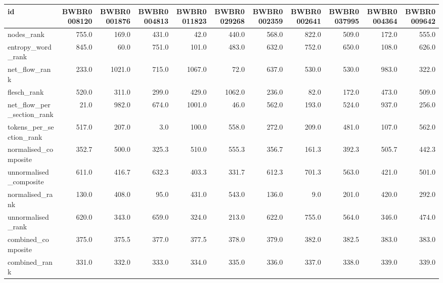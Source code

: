 \begin{tabular}{lrrrrrrrrrr}
\toprule
id & BWBR0008120 & BWBR0001876 & BWBR0004813 & BWBR0011823 & BWBR0029268 & BWBR0002359 & BWBR0002641 & BWBR0037995 & BWBR0004364 & BWBR0009642 \\
\midrule
nodes\_rank & 755.0 & 169.0 & 431.0 & 42.0 & 440.0 & 568.0 & 822.0 & 509.0 & 172.0 & 555.0 \\
\cline{1-11}
entropy\_word\_rank & 845.0 & 60.0 & 751.0 & 101.0 & 483.0 & 632.0 & 752.0 & 650.0 & 108.0 & 626.0 \\
\cline{1-11}
net\_flow\_rank & 233.0 & 1021.0 & 715.0 & 1067.0 & 72.0 & 637.0 & 530.0 & 530.0 & 983.0 & 322.0 \\
\cline{1-11}
flesch\_rank & 520.0 & 311.0 & 299.0 & 429.0 & 1062.0 & 236.0 & 82.0 & 172.0 & 473.0 & 509.0 \\
\cline{1-11}
net\_flow\_per\_section\_rank & 21.0 & 982.0 & 674.0 & 1001.0 & 46.0 & 562.0 & 193.0 & 524.0 & 937.0 & 256.0 \\
\cline{1-11}
tokens\_per\_section\_rank & 517.0 & 207.0 & 3.0 & 100.0 & 558.0 & 272.0 & 209.0 & 481.0 & 107.0 & 562.0 \\
\cline{1-11}
normalised\_composite & 352.7 & 500.0 & 325.3 & 510.0 & 555.3 & 356.7 & 161.3 & 392.3 & 505.7 & 442.3 \\
\cline{1-11}
unnormalised\_composite & 611.0 & 416.7 & 632.3 & 403.3 & 331.7 & 612.3 & 701.3 & 563.0 & 421.0 & 501.0 \\
\cline{1-11}
normalised\_rank & 130.0 & 408.0 & 95.0 & 431.0 & 543.0 & 136.0 & 9.0 & 201.0 & 420.0 & 292.0 \\
\cline{1-11}
unnormalised\_rank & 620.0 & 343.0 & 659.0 & 324.0 & 213.0 & 622.0 & 755.0 & 564.0 & 346.0 & 474.0 \\
\cline{1-11}
combined\_composite & 375.0 & 375.5 & 377.0 & 377.5 & 378.0 & 379.0 & 382.0 & 382.5 & 383.0 & 383.0 \\
\cline{1-11}
combined\_rank & 331.0 & 332.0 & 333.0 & 334.0 & 335.0 & 336.0 & 337.0 & 338.0 & 339.0 & 339.0 \\
\cline{1-11}
\bottomrule
\end{tabular}
